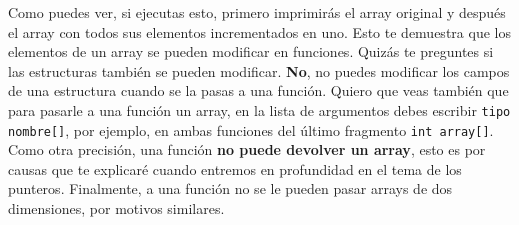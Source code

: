 \documentclass[a4paper]{article}
\begin{document}
Como puedes ver, si ejecutas esto, primero imprimirás el array original y
después el array con todos sus elementos incrementados en uno. Esto te demuestra
que los elementos de un array se pueden modificar en funciones. Quizás te
preguntes si las estructuras también se pueden modificar. \textbf{No}, no
puedes modificar los campos de una estructura cuando se la pasas a una función.
Quiero que veas también que para pasarle a una función un array, en la lista
de argumentos debes escribir \verb!tipo nombre[]!, por ejemplo, en ambas
funciones del último fragmento \verb!int array[]!. Como otra precisión, una
función \textbf{no puede devolver un array}, esto es por causas que te
explicaré cuando entremos en profundidad en el tema de los punteros. Finalmente,
a una función no se le pueden pasar arrays de dos dimensiones, por motivos
similares.
\end{document}
